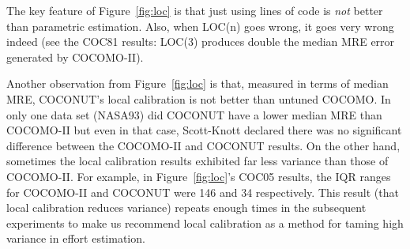 \documentclass[smallcondesed]{svjour3}
\newcommand{\fig}[1]{Figure~\ref{fig:#1}}
\begin{document}
The key feature of \fig{loc}
is that  just using lines of
code is {\em not}  better than parametric estimation.
Also, when LOC(n) goes wrong, it goes very
wrong indeed (see the COC81 results: LOC(3) produces 
double the median MRE error generated by COCOMO-II).


Another observation from \fig{loc} is that,
measured in terms of median MRE, COCONUT's local
calibration is not  better
than  untuned COCOMO. In only one data set
(NASA93) did COCONUT have a lower median MRE than
COCOMO-II but even in that case, Scott-Knott
declared there was no significant difference between
the COCOMO-II and COCONUT results.
On the other hand, sometimes the local calibration
results exhibited far less variance than those of
COCOMO-II. For example, in \fig{loc}'s COC05
results, the IQR ranges for
COCOMO-II and COCONUT were 146 and 34 respectively.
This result (that local calibration reduces
variance) repeats enough times in the subsequent
experiments to make us recommend local calibration
as a method for taming high variance in effort
estimation.
\end{document}
